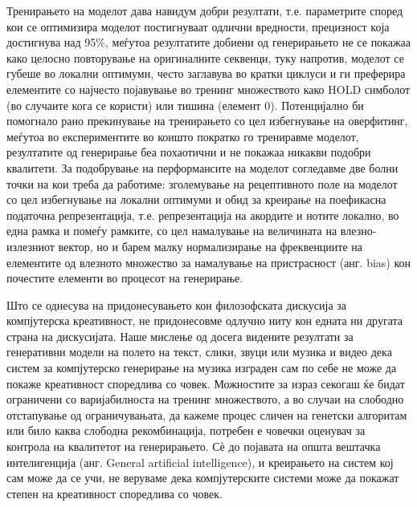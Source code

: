 Тренирањето на моделот дава навидум добри резултати, т.е. параметрите според кои се оптимизира моделот постигнуваат одлични вредности, прецизност која достигнува над 95\%, меѓутоа резултатите добиени од генерирањето не се покажаа како целосно повторување на оригиналните секвенци, туку напротив, моделот се губеше во локални оптимуми, често заглавува во кратки циклуси и ги преферира елементите со најчесто појавување во тренинг множеството како HOLD симболот (во случаите кога се користи) или тишина (елемент 0). Потенцијално би помогнало рано прекинување на тренирањето со цел избегнување на оверфитинг, меѓутоа во експериментите во коишто пократко го трениравме моделот, резултатите од генерирање беа похаотични и не покажаа никакви подобри квалитети. За подобрување на перформансите на моделот согледавме две болни точки на кои треба да работиме: зголемување на рецептивното поле на моделот со цел избегнување на локални оптимуми и обид за креирање на поефикасна податочна репрезентација, т.е. репрезентација на акордите и нотите локално, во една рамка и помеѓу рамките, со цел намалување на величината на влезно-излезниот вектор, но и барем малку нормализирање на фреквенциите на елементите од влезното множество за намалување на пристрасност (анг. bias) кон почестите елементи во процесот на генерирање.

Што се однесува на придонесувањето кон филозофската дискусија за компјутерска креативност, не придонесовме одлучно ниту кон едната ни другата страна на дискусијата. Наше мислење од досега видените резултати за генеративни модели на полето на текст, слики, звуци или музика и видео дека систем за компјутерско генерирање на музика изграден сам по себе не може да покаже креативност споредлива со човек. Можностите за израз секогаш ќе бидат ограничени со варијабилноста на тренинг множеството, а во случаи на слободно отстапување од ограничувањата, да кажеме процес сличен на генетски алгоритам или било каква слободна рекомбинација, потребен е човечки оценувач за контрола на квалитетот на генерирањето. Сѐ до појавата на општа вештачка интелигенција (анг. General artificial intelligence), и креирањето на систем кој сам може да се учи, не веруваме дека компјутерските системи може да покажат степен на креативност споредлива со човек.

